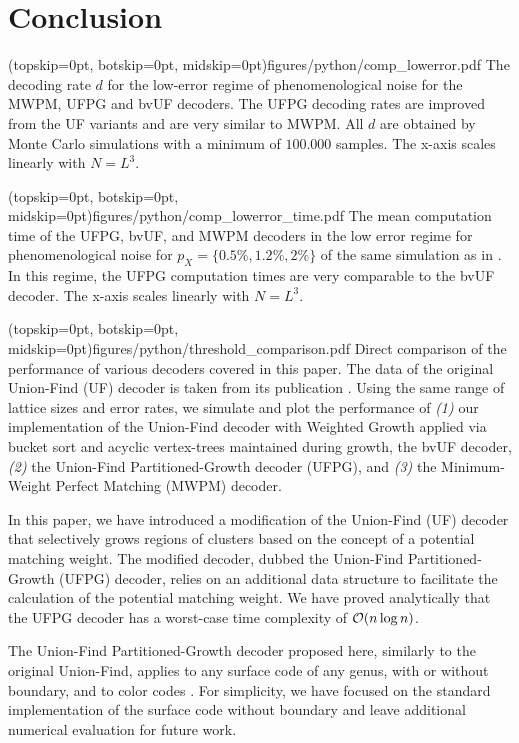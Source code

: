 \section{Conclusion}\label{sec:conclusion}

\Figure[b!](topskip=0pt, botskip=0pt, midskip=0pt){figures/python/comp_lowerror.pdf}{
  The decoding rate $d$ for the low-error regime of phenomenological noise for the MWPM, UFPG and bvUF decoders. The UFPG decoding rates are improved from the UF variants and are very similar to MWPM. All $d$ are obtained by Monte Carlo simulations with a minimum of $100.000$ samples. The x-axis scales linearly with $N = L^3$.\label{comp_lowerror}}

\Figure[b!](topskip=0pt, botskip=0pt, midskip=0pt){figures/python/comp_lowerror_time.pdf}{
  The mean computation time of the UFPG, bvUF, and MWPM decoders in the low error regime for phenomenological noise for $p_X = \{0.5\%, 1.2\%, 2\%\}$ of the same simulation as in . In this regime, the UFPG computation times are very comparable to the bvUF decoder. The x-axis scales linearly with $N = L^3$. \label{comp_lowerror_time}}

\Figure[t](topskip=0pt, botskip=0pt, midskip=0pt){figures/python/threshold_comparison.pdf}{
  Direct comparison of the performance of various decoders covered in this paper. The data of the original Union-Find (UF) decoder is taken from its publication \cite{delfosse2017almost}. Using the same range of lattice sizes and error rates, we simulate and plot the performance of \emph{(1)} our implementation of the Union-Find decoder with Weighted Growth applied via bucket sort and acyclic vertex-trees maintained during growth, the bvUF decoder, \emph{(2)} the Union-Find Partitioned-Growth decoder (UFPG), and  \emph{(3)} the Minimum-Weight Perfect Matching (MWPM) decoder.\label{thres_comp}}

In this paper, we have introduced a modification of the Union-Find (UF) decoder \cite{delfosse2017almost} that selectively grows regions of clusters based on the concept of a potential matching weight. The modified decoder, dubbed the Union-Find Partitioned-Growth (UFPG) decoder, relies on an additional data structure to facilitate the calculation of the potential matching weight. We have proved analytically that the UFPG decoder has a worst-case time complexity of $\mathcal{O}(n\log{n})$. 

The Union-Find Partitioned-Growth decoder proposed here, similarly to the original Union-Find, applies to any surface code of any genus, with or without boundary, and to color codes \cite{delfosse2017almost}. For simplicity, we have focused on the standard implementation of the surface code without boundary and leave additional numerical evaluation for future work.

